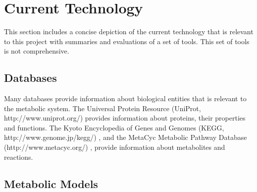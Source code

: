

\section{Current Technology}





This section includes a concise depiction of the current technology that is relevant to this project with summaries and evaluations of a set of tools.
This set of tools is not comprehensive.

\subsection{Databases}

Many databases provide information about biological entities that is relevant to the metabolic system.
The Universal Protein Resource (UniProt, http://www.uniprot.org/) \supercite{uniprot_consortium_uniprot:_2015} provides information about proteins, their properties and functions.
The Kyoto Encyclopedia of Genes and Genomes (KEGG, http://www.genome.jp/kegg/) \supercite{kanehisa_kegg_2016}, and the MetaCyc Metabolic Pathway Database (http://www.metacyc.org/) \supercite{caspi_metacyc_2016}, provide information about metabolites and reactions.

\subsection{Metabolic Models}



